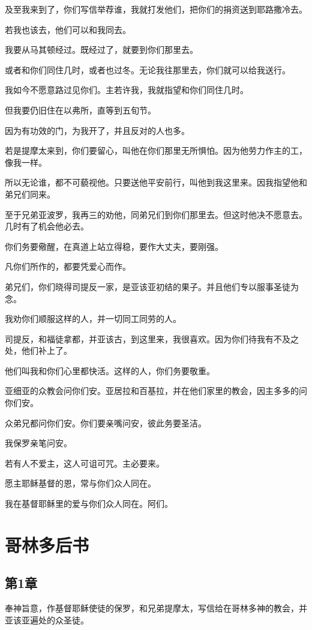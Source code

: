 \documentclass[12pt,oneside]{book}
\begin{document}
及至我来到了，你们写信举荐谁，我就打发他们，把你们的捐资送到耶路撒冷去。

若我也该去，他们可以和我同去。

我要从马其顿经过。既经过了，就要到你们那里去。

或者和你们同住几时，或者也过冬。无论我往那里去，你们就可以给我送行。

我如今不愿意路过见你们。主若许我，我就指望和你们同住几时。

但我要仍旧住在以弗所，直等到五旬节。

因为有功效的门，为我开了，并且反对的人也多。

若是提摩太来到，你们要留心，叫他在你们那里无所惧怕。因为他劳力作主的工，像我一样。

所以无论谁，都不可藐视他。只要送他平安前行，叫他到我这里来。因我指望他和弟兄们同来。

至于兄弟亚波罗，我再三的劝他，同弟兄们到你们那里去。但这时他决不愿意去。几时有了机会他必去。

你们务要儆醒，在真道上站立得稳，要作大丈夫，要刚强。

凡你们所作的，都要凭爱心而作。

弟兄们，你们晓得司提反一家，是亚该亚初结的果子。并且他们专以服事圣徒为念。

我劝你们顺服这样的人，并一切同工同劳的人。

司提反，和福徒拿都，并亚该古，到这里来，我很喜欢。因为你们待我有不及之处，他们补上了。

他们叫我和你们心里都快活。这样的人，你们务要敬重。

亚细亚的众教会问你们安。亚居拉和百基拉，并在他们家里的教会，因主多多的问你们安。

众弟兄都问你们安。你们要亲嘴问安，彼此务要圣洁。

我保罗亲笔问安。

若有人不爱主，这人可诅可咒。主必要来。

愿主耶稣基督的恩，常与你们众人同在。

我在基督耶稣里的爱与你们众人同在。阿们。

\part{哥林多后书}
\chapter{第1章}
奉神旨意，作基督耶稣使徒的保罗，和兄弟提摩太，写信给在哥林多神的教会，并亚该亚遍处的众圣徒。
\end{document}
